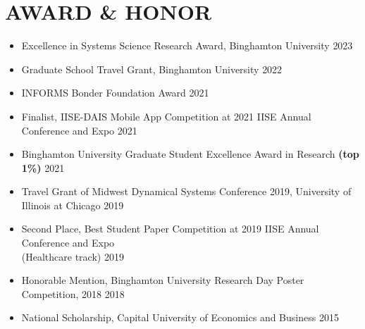 \documentclass[10pt]{article}
\begin{document}
\section*{AWARD \& HONOR}
\begin{itemize}
    \item Excellence in Systems Science Research Award, Binghamton University
	\hfill{2023}
    \item Graduate School Travel Grant, Binghamton University
	\hfill{2022}
	\item INFORMS Bonder Foundation Award
	\hfill{2021}
	\item Finalist, IISE-DAIS Mobile App Competition at 2021 IISE Annual Conference and Expo
	\hfill{2021}
	\item Binghamton University Graduate Student Excellence Award in Research \textbf{(top 1\%)}
	\hfill{2021}
	\item Travel Grant of Midwest Dynamical Systems Conference 2019, University of Illinois at Chicago 
	\hfill{2019}
	\item Second Place, Best Student Paper Competition at 2019 IISE Annual Conference and Expo \\(Healthcare track)
	\hfill{2019}
	\item Honorable Mention, Binghamton University Research Day Poster Competition, 2018
	\hfill{2018}
	\item National Scholarship, Capital University of Economics and Business
	\hfill{2015}
\end{itemize}

\end{document}
